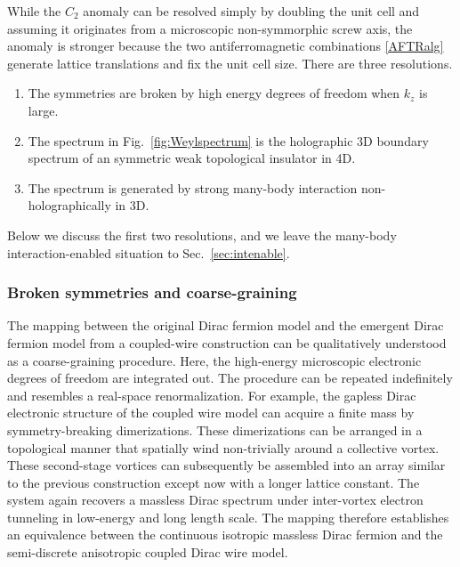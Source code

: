 While the $C_2$ anomaly can be resolved simply by doubling the unit cell and assuming it originates from a microscopic non-symmorphic screw axis, the \AFTR anomaly is stronger because the two antiferromagnetic combinations \eqref{AFTRalg} generate lattice translations and fix the unit cell size. There are three resolutions. \begin{enumerate}\item The \AFTR symmetries are broken by high energy degrees of freedom when $k_z$ is large. \item The spectrum in Fig.~\ref{fig:Weylspectrum} is the holographic 3D boundary spectrum of an \AFTR symmetric weak topological insulator in 4D. \item The spectrum is generated by strong many-body interaction non-holographically in 3D.\end{enumerate} Below we discuss the first two resolutions, and we leave the many-body interaction-enabled situation to Sec.~\ref{sec:intenable}.

\subsubsection{Broken symmetries and coarse-graining}\label{sec:brokensymmetry}
The mapping between the original Dirac fermion model and the emergent Dirac fermion model from a coupled-wire construction can be qualitatively understood as a coarse-graining procedure. Here, the high-energy microscopic electronic degrees of freedom are integrated out. The procedure can be repeated indefinitely and resembles a real-space renormalization. For example, the gapless Dirac electronic structure of the coupled wire model can acquire a finite mass by symmetry-breaking dimerizations. These dimerizations can be arranged in a topological manner that spatially wind non-trivially around a collective vortex. These second-stage vortices can subsequently be assembled into an array similar to the previous construction except now with a longer lattice constant. The system again recovers a massless Dirac spectrum under inter-vortex electron tunneling in low-energy and long length scale. The mapping therefore establishes an equivalence between the continuous isotropic massless Dirac fermion and the semi-discrete anisotropic coupled Dirac wire model.

